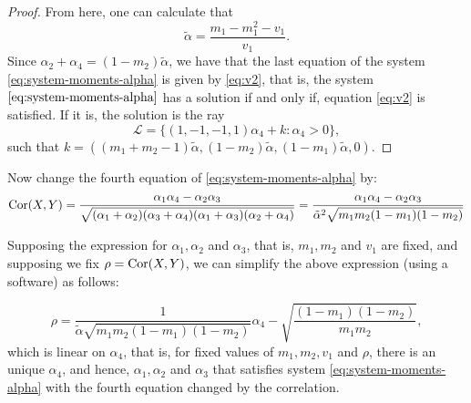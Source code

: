 \begin{proof}
From here, one can calculate that
$$
\tilde{\alpha} = \frac{m_1 - m_1^2 - v_1}{v_1}.
$$
Since $\alpha_2 + \alpha_4 = (1 - m_2)\tilde{\alpha}$, we have that the last
equation of the system \eqref{eq:system-moments-alpha} is given by
\eqref{eq:v2}, that is, the system $\eqref{eq:system-moments-alpha}$ has a solution if and
only if, equation \eqref{eq:v2} is satisfied. If it is, the solution is the ray 
$$
\mathcal{L} = \{(1,-1,-1,1)\alpha_4 + k : \alpha_4 > 0\}, 
$$
such that $k = \left((m_1 + m_2 - 1)\tilde{\alpha}, (1-m_2)\tilde{\alpha},
(1-m_1)\tilde{\alpha}, 0\right)$. 

\end{proof}


Now change the fourth equation of \eqref{eq:system-moments-alpha} by: 
$$
\operatorname{Cor}(X,Y) = \frac{\alpha_1\alpha_4 - \alpha_2\alpha_3}{\sqrt{(\alpha_1+\alpha_2)(\alpha_3+\alpha_4)(\alpha_1+\alpha_3)(\alpha_2+\alpha_4)}} = \frac{\alpha_1\alpha_4 - \alpha_2\alpha_3}{\tilde{\alpha}^2\sqrt{m_1m_2(1-m_1)(1-m_2)}}
$$

Supposing the expression for $\alpha_1, \alpha_2$ and $\alpha_3$, that is,
$m_1, m_2$ and $v_1$ are fixed, and supposing we fix $\rho = \operatorname{Cor}(X,Y)$, we
can simplify the above expression (using a software) as follows: 

$$
\rho = \frac{1}{\tilde{\alpha}\sqrt{m_1m_2(1-m_1)(1-m_2)}}\alpha_4 - \sqrt{\frac{(1 - m_1)(1 - m_2)}{m_1m_2}},
$$
which is linear on $\alpha_4$, that is, for fixed values of
$m_1, m_2, v_1$ and $\rho$, there is an unique $\alpha_4$, and hence,
$\alpha_1, \alpha_2$ and $\alpha_3$ that satisfies system
\eqref{eq:system-moments-alpha} with the fourth equation changed by the
correlation. 
